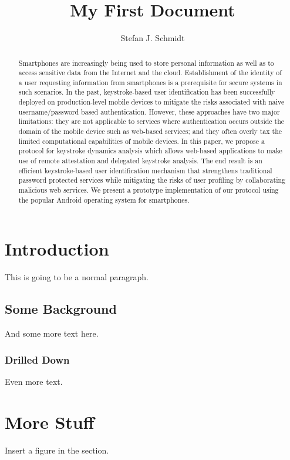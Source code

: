\documentclass{article}
\title{My First Document}
\author{Stefan J. Schmidt}
\begin{document}
\maketitle

\begin{abstract}
Smartphones are increasingly being used to store personal information as well as
to access sensitive data from the Internet and the cloud. Establishment of the
identity of a user requesting information from smartphones is a prerequisite for
secure systems in such scenarios. In the past, keystroke-based user
identification has been successfully deployed on production-level mobile devices
to mitigate the risks associated with naive username/password based
authentication. However, these approaches have two major limitations: they are
not applicable to services where authentication occurs outside the domain of the
mobile device such as web-based services; and they often overly tax the limited
computational capabilities of mobile devices. In this paper, we propose a
protocol for keystroke dynamics analysis which allows web-based applications to
make use of remote attestation and delegated keystroke analysis. The end result
is an efficient keystroke-based user identification mechanism that strengthens
traditional password protected services while mitigating the risks of user
profiling by collaborating malicious web services. We present a prototype
implementation of our protocol using the popular Android operating system for
smartphones.
\end{abstract}

\section{Introduction}
This is going to be a normal paragraph.

\subsection{Some Background}
And some more text here.

\subsubsection{Drilled Down}\label{sec:drilled-down}
Even more text.

\newpage

\section{More Stuff}
Insert a figure in the section.
\end{document}
